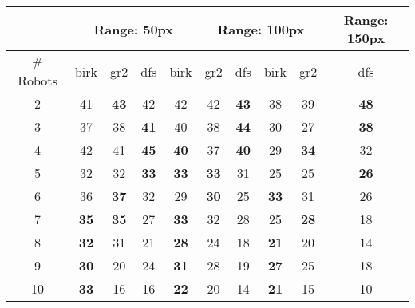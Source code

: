 \begin{tabular}{|c|c|c|c|c|c|c|c|c|c|}
\hline
& \multicolumn{4}{|c|}{Range: 50px} & \multicolumn{4}{|c|}{Range: 100px} & \multicolumn{4}{|c|}{Range: 150px} \\ \hline
\# Robots & birk & gr2 & dfs & birk & gr2 & dfs & birk & gr2 & dfs \\ \hline
2 & 41 & \textbf{43} & 42 & 42 & 42 & \textbf{43} & 38 & 39 & \textbf{48} \\ \hline
3 & 37 & 38 & \textbf{41} & 40 & 38 & \textbf{44} & 30 & 27 & \textbf{38} \\ \hline
4 & 42 & 41 & \textbf{45} & \textbf{40} & 37 & \textbf{40} & 29 & \textbf{34} & 32 \\ \hline
5 & 32 & 32 & \textbf{33} & \textbf{33} & \textbf{33} & 31 & 25 & 25 & \textbf{26} \\ \hline
6 & 36 & \textbf{37} & 32 & 29 & \textbf{30} & 25 & \textbf{33} & 31 & 26 \\ \hline
7 & \textbf{35} & \textbf{35} & 27 & \textbf{33} & 32 & 28 & 25 & \textbf{28} & 18 \\ \hline
8 & \textbf{32} & 31 & 21 & \textbf{28} & 24 & 18 & \textbf{21} & 20 & 14 \\ \hline
9 & \textbf{30} & 20 & 24 & \textbf{31} & 28 & 19 & \textbf{27} & 25 & 18 \\ \hline
10 & \textbf{33} & 16 & 16 & \textbf{22} & 20 & 14 & \textbf{21} & 15 & 10 \\ \hline
\end{tabular}